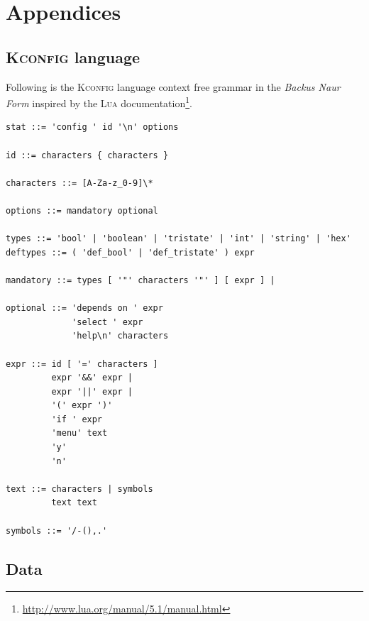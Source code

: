 \documentclass[a4paper,11pt]{report}
\newcommand{\f}{\footnote{\fn}}
\begin{document}
\newpage




            \newpage
            \chapter{Appendices}


            \section{\textsc{Kconfig} language}
            \label{app:kconfig}

            \def \fn {\url{http://www.lua.org/manual/5.1/manual.html}}

Following is the \textsc{Kconfig} language context free grammar in the 
\emph{Backus Naur Form} inspired by the \textsc{Lua} documentation\f.

\begin{verbatim}
stat ::= 'config ' id '\n' options

id ::= characters { characters }

characters ::= [A-Za-z_0-9]\*

options ::= mandatory optional

types ::= 'bool' | 'boolean' | 'tristate' | 'int' | 'string' | 'hex'
deftypes ::= ( 'def_bool' | 'def_tristate' ) expr

mandatory ::= types [ '"' characters '"' ] [ expr ] |

optional ::= 'depends on ' expr
             'select ' expr
             'help\n' characters

expr ::= id [ '=' characters ] 
         expr '&&' expr |
         expr '||' expr |
         '(' expr ')'
         'if ' expr
         'menu' text
         'y'
         'n'

text ::= characters | symbols 
         text text

symbols ::= '/-(),.'

\end{verbatim}


            \section{Data}
\end{document}
